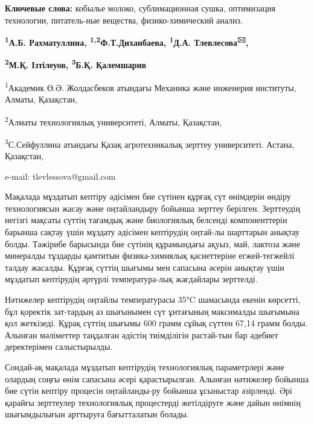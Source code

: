 {\bfseries Ключевые слова:} кобылье молоко, сублимационная сушка,
оптимизация технологии, питатель-ные вещества, физико-химический анализ.

\begin{center}

{\bfseries \textsuperscript{1}А.Б. Рахматуллина,
\textsuperscript{1,2}Ф.Т.Диханбаева, \textsuperscript{1}Д.А.
Тлевлесова\textsuperscript{🖂},}

{\bfseries \textsuperscript{2}М.Қ. Ізтілеуов, \textsuperscript{3}Б.Қ.
Қалемшарив}

\textsuperscript{1}Академик Ө.Ә. Жолдасбеков атындағы Механика және
инженерия институты, Алматы, Қазақстан,

\textsuperscript{2}Алматы технологиялық университеті, Алматы, Қазақстан,

\textsuperscript{3}С.Сейфуллина атындағы Қазақ агротехникалық зерттеу
университеті. Астана, Қазақстан,

e-mail: tlevlessova@gmail.com
\end{center}

Мақалада мұздатып кептіру әдісімен бие сүтінен құрғақ сүт өнімдерін
өндіру технологиясын жасау және оңтайландыру бойынша зерттеу берілген.
Зерттеудің негізгі мақсаты сүттің тағамдық және биологиялық белсенді
компоненттерін барынша сақтау үшін мұздату әдісімен кептірудің оңтай-лы
шарттарын анықтау болды. Тәжірибе барысында бие сүтінің құрамындағы
ақуыз, май, лактоза және минералды тұздарды қамтитын физика-химиялық
қасиеттеріне егжей-тегжейлі талдау жасалды. Құрғақ сүттің шығымы мен
сапасына әсерін анықтау үшін мұздатып кептірудің әртүрлі температура-лық
жағдайлары зерттелді.

Нәтижелер кептірудің оңтайлы температурасы 35°C шамасында екенін
көрсетті, бұл қоректік зат-тардың аз шығынымен сүт ұнтағының максималды
шығымына қол жеткізеді. Құрақ сүттің шығымы 600 грамм сұйық сүттен 67,14
грамм болды. Алынған мәліметтер таңдалған әдістің тиімділігін растай-тын
бар әдебиет деректерімен салыстырылды.

Сондай-ақ мақалада мұздатып кептірудің технологиялық параметрлері және
олардың соңғы өнім сапасына әсері қарастырылған. Алынған нәтижелер
бойынша бие сүтін кептіру процесін оңтайланды-ру бойынша ұсыныстар
әзірленді. Әрі қарайғы зерттеулер технологиялық процестерді жетілдіруге
және дайын өнімнің шығымдылығын арттыруға бағытталатын болады.

